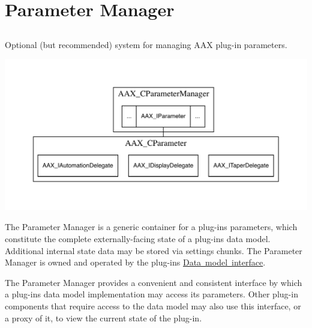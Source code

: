\hypertarget{a00814}{}\section{Parameter Manager}
\label{a00814}


\subsection{ }
Optional (but recommended) system for managing A\+AX plug-\/in parameters. 


\begin{DoxyImageNoCaption}
  \mbox{\includegraphics[width=\textwidth,height=\textheight/2,keepaspectratio=true]{dot_aax_cparammgr_contained}}
\end{DoxyImageNoCaption}


The Parameter Manager is a generic container for a plug-\/in\textquotesingle{}s parameters, which constitute the complete externally-\/facing state of a plug-\/in\textquotesingle{}s data model. Additional internal state data may be stored via settings chunks. The Parameter Manager is owned and operated by the plug-\/in\textquotesingle{}s \mbox{\hyperlink{a00798}{Data model interface}}.

The Parameter Manager provides a convenient and consistent interface by which a plug-\/in\textquotesingle{}s data model implementation may access its parameters. Other plug-\/in components that require access to the data model may also use this interface, or a proxy of it, to view the current state of the plug-\/in.

